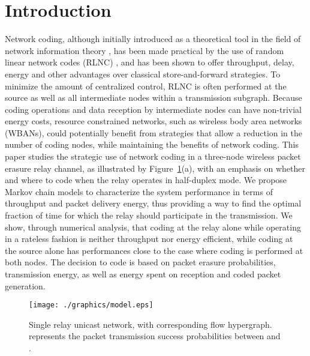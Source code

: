 \documentclass[journal, letterpaper]{IEEEtran}
\begin{document}
\section{Introduction}\label{sec:introduction}
Network coding, although initially introduced as a theoretical tool in the field of network information theory \cite{ahlswede2000network}, has been made practical by the use of random linear network codes (RLNC) \cite{chou2003practical, ho2006random}, and has been shown to offer throughput, delay, energy and other advantages over classical store-and-forward strategies. To minimize the amount of centralized control, RLNC is often performed at the source as well as all intermediate nodes within a transmission subgraph. Because coding operations and data reception by intermediate nodes can have non-trivial energy costs, resource constrained networks, such as wireless body area networks (WBANs), could potentially benefit from strategies that allow a reduction in the number of coding nodes, while maintaining the benefits of network coding. This paper studies the strategic use of network coding in a three-node wireless packet erasure relay channel, as illustrated by Figure~\ref{fig:model}(a), with an emphasis on whether and where to code when the relay operates in half-duplex mode. We propose Markov chain models to characterize the system performance in terms of throughput and packet delivery energy, thus providing a way to find the optimal fraction of time for which the relay should participate in the transmission. We show, through numerical analysis, that coding at the relay alone while operating in a rateless fashion is neither throughput nor energy efficient, while coding at the source alone has performances close to the case where coding is performed at both nodes. The decision to code is based on packet erasure probabilities, transmission energy, as well as energy spent on reception and coded packet generation.
\begin{figure}[t!]
  \centering
  \texttt{[image: ./graphics/model.eps]}
  \caption{Single relay unicast network, with corresponding flow hypergraph.  represents the packet transmission success probabilities between  and .}
  \label{fig:model}
\end{figure}
\end{document}
